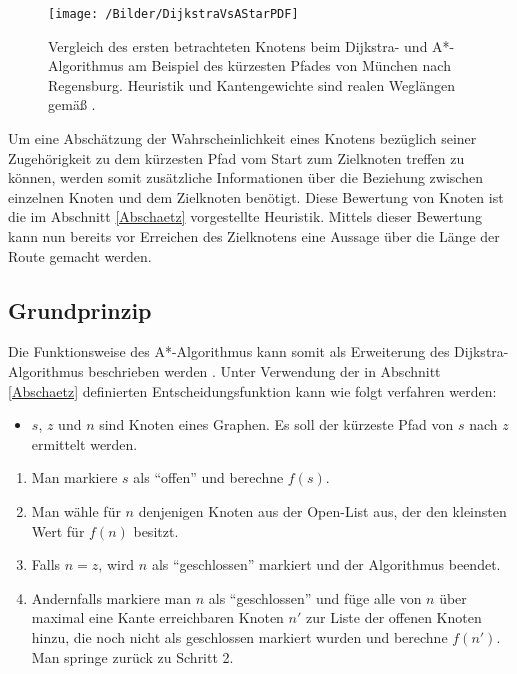 	\begin{figure}[h]
	\centering
	\texttt{[image: /Bilder/DijkstraVsAStarPDF]}
	\vspace{0.2cm}
	\caption{Vergleich des ersten betrachteten Knotens beim Dijkstra- und A*-Algorithmus am Beispiel des kürzesten Pfades von München nach Regensburg. Heuristik und Kantengewichte sind realen Weglängen gemäß \cite{Luftlinie}.} \label{DijkstraVsA*}
	\end{figure}
	
	Um eine Abschätzung der Wahrscheinlichkeit eines Knotens bezüglich seiner Zugehörigkeit zu dem  kürzesten Pfad vom Start zum Zielknoten treffen zu können, werden somit zusätzliche Informationen über die Beziehung zwischen einzelnen Knoten und dem Zielknoten benötigt. Diese Bewertung von Knoten ist die im Abschnitt \ref{Abschaetz} vorgestellte Heuristik. Mittels dieser Bewertung kann nun bereits vor Erreichen des Zielknotens eine Aussage über die Länge der Route gemacht werden. 
	
	\subsection{Grundprinzip}
		\label{A*-Alg}
		Die Funktionsweise des A*-Algorithmus kann somit als Erweiterung des Dijkstra-Algorithmus beschrieben werden \cite{Hart1968}. Unter Verwendung der in Abschnitt \ref{Abschaetz} definierten Entscheidungsfunktion kann wie folgt verfahren werden:
		
		\begin{itemize}
			 \item 	$s$, $z$ und $n$ sind Knoten eines Graphen. Es soll der kürzeste Pfad von $s$ nach $z$ ermittelt werden. 
			
		\end{itemize}
		
		\begin{center}
			
			\begin{minipage}{0.8\linewidth}
				
				
				\begin{enumerate}
					\item Man markiere $s$ als "`offen"' und berechne $f(s)$.
					\item Man wähle für $n$ denjenigen Knoten aus der Open-List aus, der den  kleinsten Wert für $f(n)$ besitzt.
					\item Falls $n=z$, wird $n$ als "`geschlossen"' markiert und der Algorithmus beendet.
					\item Andernfalls markiere man $n$ als "`geschlossen"' und füge alle von $n$ über maximal eine Kante erreichbaren Knoten $n'$ zur Liste der offenen Knoten hinzu, die noch nicht als geschlossen markiert wurden und berechne $f(n')$. 	Man springe zurück zu Schritt 2.
				\end{enumerate}
			\end{minipage}
		\end{center}
		
